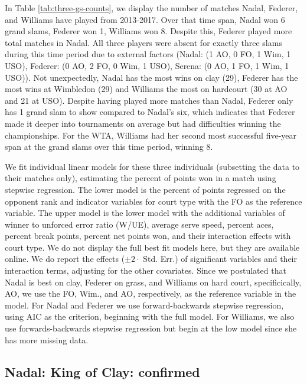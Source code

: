 \documentclass[]{article}
\begin{document}
In Table \ref{tab:three-gs-counts}, we display the number of matches
Nadal, Federer, and Williams have played from 2013-2017. Over that time
span, Nadal won 6 grand slams, Federer won 1, Williams won 8. Despite
this, Federer played more total matches in Nadal. All three players were
absent for exactly three slams during this time period due to external
factors (Nadal: (1 AO, 0 FO, 1 Wim, 1 USO), Federer: (0 AO, 2 FO, 0 Wim,
1 USO), Serena: (0 AO, 1 FO, 1 Wim, 1 USO)). Not unexpectedly, Nadal has
the most wins on clay (29), Federer has the most wins at Wimbledon (29)
and Williams the most on hardcourt (30 at AO and 21 at USO). Despite
having played more matches than Nadal, Federer only has 1 grand slam to
show compared to Nadal's six, which indicates that Federer made it
deeper into tournaments on average but had difficulties winning the
championships. For the WTA, Williams had her second most successful
five-year span at the grand slams over this time period, winning 8.

We fit individual linear models for these three individuals (subsetting
the data to their matches only), estimating the percent of points won in
a match using stepwise regression. The lower model is the percent of
points regressed on the opponent rank and indicator variables for court
type with the FO as the reference variable. The upper model is the lower
model with the additional variables of winner to unforced error ratio
(W/UE), average serve speed, percent aces, percent break points, percent
net points won, and their interaction effects with court type. We do not
display the full best fit models here, but they are available online. We
do report the effects (\(\pm 2 \cdot\) Std. Err.) of significant
variables and their interaction terms, adjusting for the other
covariates. Since we postulated that Nadal is best on clay, Federer on
grass, and Williams on hard court, specificically, AO, we use the FO,
Wim., and AO, respectively, as the reference variable in the model. For
Nadal and Federer we use forward-backwards stepwise regression, using
AIC as the criterion, beginning with the full model. For Williams, we
also use forwards-backwards stepwise regression but begin at the low
model since she has more missing data.

\hypertarget{nadal-king-of-clay-confirmed}{%
\subsection{Nadal: King of Clay:
confirmed}\label{nadal-king-of-clay-confirmed}}
\end{document}
